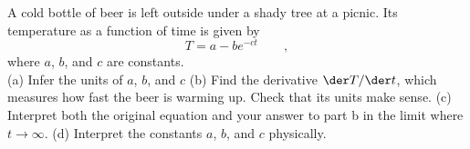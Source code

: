 A cold bottle of beer is left outside under a shady tree
at a picnic. Its temperature as a function of time is given
by
\begin{equation*}
  T = a - b e^{-ct} \qquad ,
\end{equation*}
where $a$, $b$, and $c$ are constants.\\
(a) Infer the units of $a$, $b$, and $c$\hwendpart
(b) Find the derivative $\der T/\der t$, which measures how fast the beer
is warming up. Check that its units make sense.\hwendpart
(c) Interpret both the original equation and
your answer to part b in the limit where $t\rightarrow\infty$.\hwendpart
(d) Interpret the constants $a$, $b$, and $c$ physically.
